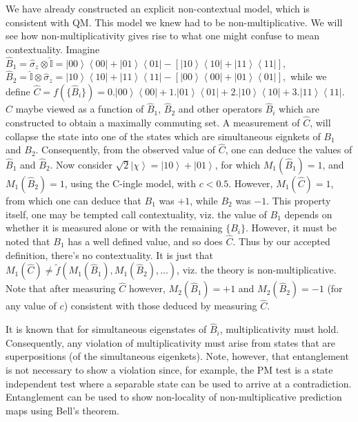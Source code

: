 \documentclass[british,aps,prl,superscriptaddress,nofootinbib,times,reprint]{revtex4-1}
\theoremstyle{plain}
\theoremstyle{plain}
\theoremstyle{definition}
\theoremstyle{remark}
\theoremstyle{remark}
\theoremstyle{remark}
\theoremstyle{plain}
\theoremstyle{plain}
\theoremstyle{plain}
\theoremstyle{definition}
\theoremstyle{definition}
\begin{document}
We have already constructed an explicit non-contextual model,
which is consistent with QM.  This model we knew
had to be non-multiplicative.  We will see how
non-multiplicativity gives rise to what one might
confuse to mean contextuality.  Imagine $\hat{B}_{1}=\hat{\sigma}_{z}\otimes\hat{\mathbb{I}}=\left|00\right\rangle
\left\langle 00\right|+\left|01\right\rangle
\left\langle 01\right|-\left[\left|10\right\rangle
\left\langle 10\right|+\left|11\right\rangle
\left\langle 11\right|\right],$ $
\hat{B}_{2}=\hat{\mathbb{I}}\otimes\hat{\sigma}_{z}=\left|10\right\rangle
\left\langle 10\right|+\left|11\right\rangle
\left\langle 11\right|-\left[\left|00\right\rangle
\left\langle 00\right|+\left|01\right\rangle
\left\langle 01\right|\right],$ while we define
$ \hat{C}=f(\{\hat{B}_{i}\})
=0.\left|00\right\rangle \left\langle
00\right|+1.\left|01\right\rangle \left\langle
01\right|+2.\left|10\right\rangle \left\langle
10\right|+3.\left|11\right\rangle \left\langle
11\right|. $
 $\hat{C}$ maybe viewed as
a function of $\hat{B}_{1}$, $\hat{B}_{2}$ and
other operators $\hat{B}_{i}$ which are
constructed to obtain a maximally commuting set. A
measurement of $\hat{C}$, will collapse the state
into one of the states which are simultaneous
eignkets of $B_{1}$ and $B_{2}$. Consequently,
from the observed value of $\hat{C}$, one can
deduce the values of $\hat{B}_{1}$ and
$\hat{B}_{2}$. Now consider
$\sqrt{2}\left|\chi\right\rangle
=\left|10\right\rangle +\left|01\right\rangle $,
for which $M_{1}(\hat{B}_{1})=1$, and
$M_{1}(\hat{B}_{2})=1$, using the C-ingle model,
with $c<0.5$. However, $M_{1}(\hat{C})=1$, from
which one can deduce that $B_{1}$ was $+1$, while
$B_{2}$ was $-1$.  This property itself, one may
be tempted call contextuality, viz.  the value of
$B_{1}$ depends on whether it is measured alone or
with the remaining $\{B_{i}\}$. However, it must
be noted that $B_{1}$ has a well defined value,
and so does $\hat{C}$. Thus by our accepted
definition, there's no contextuality. It is just
that $M_{1}(\hat{C})\neq
\tilde f(M_{1}(\hat{B}_{1}),M_{1}(\hat{B}_{2}),\dots)$,
viz. the theory is non-multiplicative. Note that
after measuring $\hat{C}$ however,
$M_{2}(\hat{B}_{1})=+1$ and
$M_{2}(\hat{B}_{2})=-1$ (for any value of $c$)
consistent with those deduced by measuring
$\hat{C}$.


It is known that for simultaneous eigenstates of
$\hat{B}_{i}$, multiplicativity must hold.
Consequently, any violation of multiplicativity
must arise from states that are superpositions (of
the simultaneous eigenkets).  Note, however, that
entanglement is not necessary to show a violation
since, for example, the PM test is a state
independent test where a separable state can be
used to arrive at a contradiction. Entanglement 
can be used to show non-locality of non-multiplicative
prediction maps using Bell's theorem.


\end{document}

